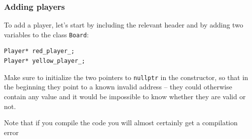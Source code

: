 \documentclass{article}
\begin{document}
\subsubsection{Adding players}

To add a player, let's start by including the relevant header and by adding two variables to the class \texttt{Board}:
\begin{center}
\begin{minipage}{.9\textwidth}
\begin{lstlisting}[style=mycpp,numbers=none]
Player* red_player_;
Player* yellow_player_;
\end{lstlisting}
\end{minipage}
\end{center}
Make sure to initialize the two pointers to \texttt{nullptr} in the constructor, so that in the beginning they point to a known invalid address -- they could otherwise contain any value and it would be impossible to know whether they are valid or not.

Note that if you compile the code you will almost certainly get a compilation error 
\end{document}
